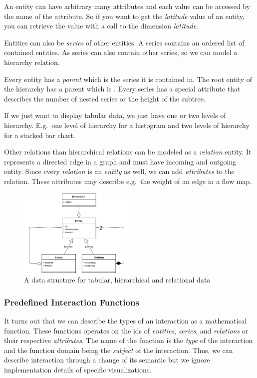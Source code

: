 An entity can have arbitrary many attributes and each value can be accessed by the name of the attribute.
So if you want to get the \emph{latitude} value of an entity, you can retrieve the value with a call to the dimension \emph{latitude}.

Entities can also be \emph{series} of other entities.
A series contains an ordered list of contained entities.
As series can also contain other series, so we can model a hierarchy relation.

Every entity has a \emph{parent} which is the series it is contained in.
The root entity of the hierarchy has a parent which is .
Every series has a special attribute  that describes the number of nested series or the height of the subtree.

If we just want to display tabular data, we just have one or two levels of hierarchy.
E.g.\ one level of hierarchy for a histogram and two levels of hierarchy for a stacked bar chart.

Other relations than hierarchical relations can be modeled as a \emph{relation} entity.
It represents a directed edge in a graph and must have incoming and outgoing entity.
Since every \emph{relation} is an \emph{entity} as well, we can add \emph{attributes} to the relation.
These attributes may describe e.g.\ the weight of an edge in a flow map.


\begin{figure}[h!]
  \centering
  \includegraphics[width=0.5\textwidth]{images/concept/shared-data-model.png}
  \caption{%
    A data structure for tabular, hierarchical and relational data
  }\label{fig:concept:shared-data-model}
\end{figure}

\subsubsection{Predefined Interaction Functions}\label{sec:concept:types}

It turns out that we can describe the types of an interaction as a mathematical function.
These functions operates on the ids of \emph{entities}, \emph{series}, and \emph{relations} or their respective \emph{attributes}.
The name of the function is the \emph{type} of the interaction and the function domain being the \emph{subject} of the interaction.
Thus, we can describe interaction through a change of its semantic but we ignore implementation details of specific visualizations.


